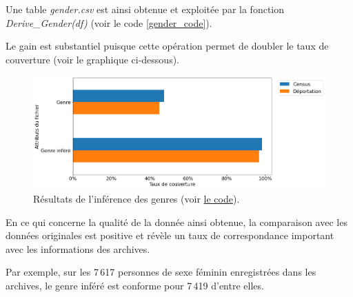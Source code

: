 \documentclass[a4paper,12pt,twoside]{book}
\begin{document}
	               Une table \textit{gender.csv} est ainsi obtenue et exploitée par la fonction \textit{Derive\_Gender(df)} (voir le code \ref{gender_code}).
	               
	               Le gain est substantiel puisque cette opération permet de doubler le taux de couverture (voir le graphique ci-dessous). 
	               
	               \begin{figure}[!ht]
        			\centering
                    \includegraphics[width=\textwidth]{images/derived_gender.png}
                    \vspace{-2em}
                    \caption{Résultats de l'inférence des genres (voir \hyperref[analyse5]{le code}).}
                    \label{fig16}
                    \end{figure}
	                
	                En ce qui concerne la qualité de la donnée ainsi obtenue, la comparaison avec les données originales est positive et révèle un taux de correspondance important avec les informations des archives.
	                
	                Par exemple, sur les 7\,617 personnes de sexe féminin enregistrées dans les archives, le genre inféré est conforme pour 7\,419 d'entre elles.
	                
\end{document}
